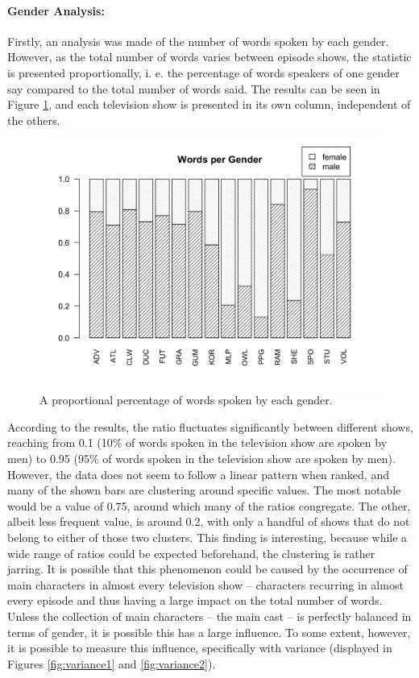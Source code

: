 \documentclass[a4paper, 11pt]{article}
\begin{document}
\paragraph{Gender Analysis:}
Firstly, an analysis was made of the number of words spoken by each gender. However, as the total number of words varies between episode shows, the statistic is presented proportionally, i. e. the percentage of words speakers of one gender say compared to the total number of words said. The results can be seen in Figure \ref{fig:worpergen}, and each television show is presented in its own column, independent of the others.

\begin{figure}[t!]
  \includegraphics[width=\linewidth]{figures/worpergen.png}
  \caption{A proportional percentage of words spoken by each gender.}
  \label{fig:worpergen}
\end{figure}

According to the results, the ratio fluctuates significantly between different shows, reaching from 0.1 (10\% of words spoken in the television show are spoken by men) to 0.95 (95\% of words spoken in the television show are spoken by men). However, the data does not seem to follow a linear pattern when ranked, and many of the shown bars are clustering around specific values. The most notable would be a value of 0.75, around which many of the ratios congregate. The other, albeit less frequent value, is around 0.2, with only a handful of shows that do not belong to either of those two clusters. This finding is interesting, because while a wide range of ratios could be expected beforehand, the clustering is rather jarring. It is possible that this phenomenon could be caused by the occurrence of main characters in almost every television show -- characters recurring in almost every episode and thus having a large impact on the total number of words. Unless the collection of main characters -- the main cast -- is perfectly balanced in terms of gender, it is possible this has a large influence. To some extent, however, it is possible to measure this influence, specifically with variance (displayed in Figures \ref{fig:variance1} and \ref{fig:variance2}).
\end{document}
